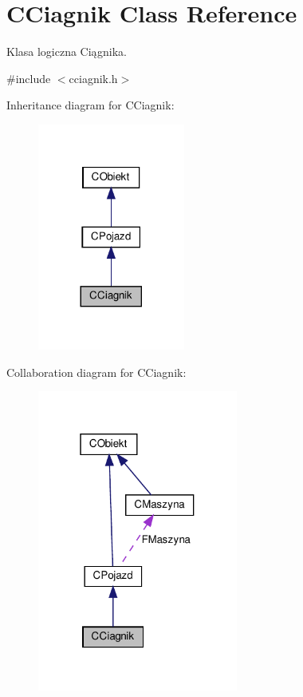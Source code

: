\hypertarget{class_c_ciagnik}{}\section{C\+Ciagnik Class Reference}
\label{class_c_ciagnik}


Klasa logiczna Ciągnika.  




{\ttfamily \#include $<$cciagnik.\+h$>$}



Inheritance diagram for C\+Ciagnik\+:\nopagebreak
\begin{figure}[H]
\begin{center}
\leavevmode
\includegraphics[width=137pt]{class_c_ciagnik__inherit__graph}
\end{center}
\end{figure}


Collaboration diagram for C\+Ciagnik\+:\nopagebreak
\begin{figure}[H]
\begin{center}
\leavevmode
\includegraphics[width=187pt]{class_c_ciagnik__coll__graph}
\end{center}
\end{figure}
